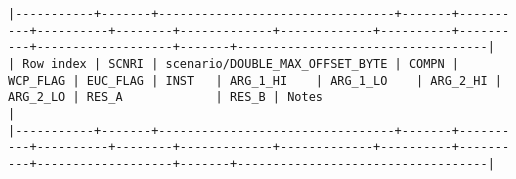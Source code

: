 \documentclass[varwidth=\maxdimen,margin=0.5cm,multi={verbatim}]{standalone}
\begin{document}
\begin{verbatim}
|-----------+-------+---------------------------------+-------+----------+----------+--------+-------------+-------------+----------+----------+-------------------+-------+-----------------------------------|
| Row index | SCNRI | scenario/DOUBLE_MAX_OFFSET_BYTE | COMPN | WCP_FLAG | EUC_FLAG | INST   | ARG_1_HI    | ARG_1_LO    | ARG_2_HI | ARG_2_LO | RES_A             | RES_B | Notes                             |
|-----------+-------+---------------------------------+-------+----------+----------+--------+-------------+-------------+----------+----------+-------------------+-------+-----------------------------------|

\end{verbatim}
\end{document}
